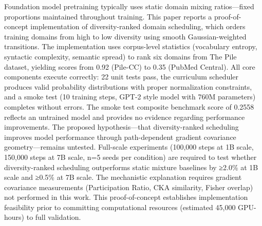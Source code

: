 
Foundation model pretraining typically uses static domain mixing ratios—fixed proportions maintained throughout training. This paper reports a proof-of-concept implementation of diversity-ranked domain scheduling, which orders training domains from high to low diversity using smooth Gaussian-weighted transitions. The implementation uses corpus-level statistics (vocabulary entropy, syntactic complexity, semantic spread) to rank six domains from The Pile dataset, yielding scores from 0.92 (Pile-CC) to 0.35 (PubMed Central). All core components execute correctly: 22 unit tests pass, the curriculum scheduler produces valid probability distributions with proper normalization constraints, and a smoke test (10 training steps, GPT-2 style model with 760M parameters) completes without errors. The smoke test composite benchmark score of 0.2558 reflects an untrained model and provides no evidence regarding performance improvements. The proposed hypothesis—that diversity-ranked scheduling improves model performance through path-dependent gradient covariance geometry—remains untested. Full-scale experiments (100,000 steps at 1B scale, 150,000 steps at 7B scale, n=5 seeds per condition) are required to test whether diversity-ranked scheduling outperforms static mixture baselines by ≥2.0\% at 1B scale and ≥0.5\% at 7B scale. The mechanistic explanation requires gradient covariance measurements (Participation Ratio, CKA similarity, Fisher overlap) not performed in this work. This proof-of-concept establishes implementation feasibility prior to committing computational resources (estimated 45,000 GPU-hours) to full validation.
